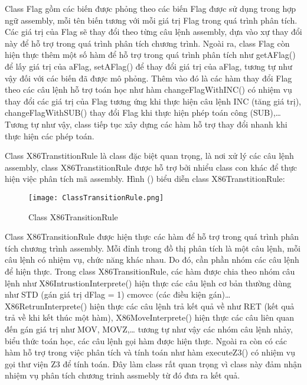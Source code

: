 Class Flag gồm các biến được phỏng theo các biến Flag được sử dụng trong hợp ngữ assembly, mỗi tên biến tương với mỗi giá trị Flag trong quá trình phân tích. Các giá trị của Flag sẽ thay đổi theo từng câu lệnh assembly, dựa vào xự thay đổi này để hỗ trợ trong quá trình phân tích chương trình. Ngoài ra, class Flag còn hiện thực thêm một số hàm để hỗ trợ trong quá trình phân tích như getAFlag() để lấy giá trị của aFlag, setAFlag() để thay đổi giá trị của aFlag, tương tự như vậy đối với các biến đã được mô phỏng. Thêm vào đó là các hàm thay đổi Flag theo các câu lệnh hỗ trợ toán học như hàm changeFlagWithINC() có nhiệm vụ thay đổi các giá trị của Flag tương ứng khi thực hiện câu lệnh INC (tăng giá trị), changeFlagWithSUB() thay đổi Flag khi thực hiện phép toán công (SUB),… Tương tự như vậy, class tiếp tục xây dựng các hàm hỗ trợ thay đổi nhanh khi thực hiện các phép toán.


	\newpage
	Class X86TranstitionRule là class đặc biệt quan trọng, là nơi xử lý các câu lệnh assembly, class X86TranstitionRule được hỗ trợ bởi nhiểu class con khác để thực hiện việc phân tích mã assembly. Hình () biểu diễn class X86TranstitionRule:
	\begin{center}
			\begin{figure}[htp]
				\begin{center}
					\texttt{[image: ClassTransitionRule.png]}
				\end{center}
				\caption{Class X86TransitionRule	}	
					\label{fig:ClassFlag}		
			\end{figure}
		\end{center}			
		
	Class X86TransitionRule được hiện thực các hàm để hỗ trợ trong quá trình phân tích chương trình assembly. Mỗi đỉnh trong đồ thị phân tích là một câu lệnh, mỗi câu lệnh có nhiệm vụ, chức năng khác nhau. Do đó, cần phần nhóm các câu lệnh để hiện thực. Trong class X86TransitionRule, các hàm được chia theo nhóm câu lệnh như X86IntrustionInterprete() hiện thực các câu lệnh cơ bản thường dùng như STD (gán giá trị dFlag = 1) cmovcc (các điều kiện gán)… X86RetrunInterprete() hiện thực các câu lệnh trả kết quả về như RET (kết quả trả về khi kết thúc một hàm), X86MoveInterprete() hiện thực các câu liên quan đến gán giá trị như MOV, MOVZ,… tương tự như vậy các nhóm câu lệnh nhảy, biểu thức toán học, các câu lệnh gọi hàm được hiện thực. Ngoài ra còn có các hàm hỗ trợ trong việc phân tích và tính toán như hàm executeZ3() có nhiệm vụ gọi thư viện Z3 để tính toán. Đây làm class rất quan trọng vì class này đảm nhận nhiệm vụ phân tích chương trinh assmebly từ đó đưa ra kết quả.
	
